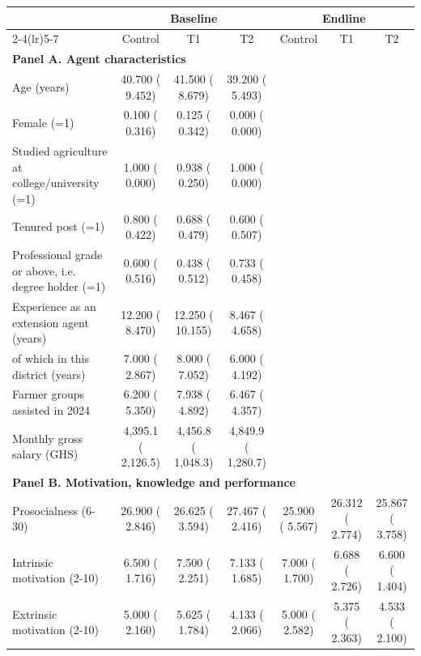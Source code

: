 \def\sym#1{\ifmmode^{#1}\else\(^{#1}\)\fi}
\begin{tabular}{lcccccc}
\toprule
 & \multicolumn{3}{c}{Baseline} & \multicolumn{3}{c}{Endline} \\
\cmidrule(lr){2-4}\cmidrule(lr){5-7}
 & Control & T1 & T2 & Control & T1 & T2 \\
\midrule
\multicolumn{7}{l}{\textbf{Panel A. Agent characteristics}} \\
Age (years) &    40.700 (    9.452) &    41.500 (    8.679) &    39.200 (    5.493) &  &  &  \\
Female (=1) &     0.100 (    0.316) &     0.125 (    0.342) &     0.000 (    0.000) &  &  &  \\
Studied agriculture at college/university (=1) &     1.000 (    0.000) &     0.938 (    0.250) &     1.000 (    0.000) &  &  &  \\
Tenured post (=1) &     0.800 (    0.422) &     0.688 (    0.479) &     0.600 (    0.507) &  &  &  \\
Professional grade or above, i.e. degree holder (=1) &     0.600 (    0.516) &     0.438 (    0.512) &     0.733 (    0.458) &  &  &  \\
Experience as an extension agent (years) &    12.200 (    8.470) &    12.250 (   10.155) &     8.467 (    4.658) &  &  &  \\
\quad of which in this district (years) &     7.000 (    2.867) &     8.000 (    7.052) &     6.000 (    4.192) &  &  &  \\
Farmer groups assisted in 2024 &     6.200 (    5.350) &     7.938 (    4.892) &     6.467 (    4.357) &  &  &  \\
Monthly gross salary (GHS) &      4,395.1 (     2,126.5) &      4,456.8 (     1,048.3) &      4,849.9 (     1,280.7) &  &  &  \\
\midrule
\multicolumn{7}{l}{\textbf{Panel B. Motivation, knowledge and performance}} \\
Prosocialness (6-30) &    26.900 (    2.846) &    26.625 (    3.594) &    27.467 (    2.416) &    25.900 (    5.567) &    26.312 (    2.774) &    25.867 (    3.758) \\
Intrinsic motivation (2-10) &     6.500 (    1.716) &     7.500 (    2.251) &     7.133 (    1.685) &     7.000 (    1.700) &     6.688 (    2.726) &     6.600 (    1.404) \\
Extrinsic motivation (2-10) &     5.000 (    2.160) &     5.625 (    1.784) &     4.133 (    2.066) &     5.000 (    2.582) &     5.375 (    2.363) &     4.533 (    2.100) \\

\end{tabular}
